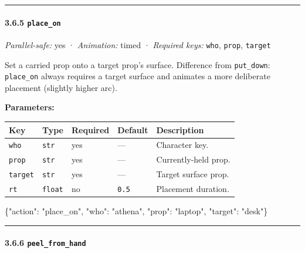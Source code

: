 \documentclass[
  12pt,
  letterpaper,
]{book}
\newenvironment{Shaded}{}{}
\newcommand{\DataTypeTok}[1]{\textcolor[rgb]{0.56,0.13,0.00}{#1}}
\newcommand{\FunctionTok}[1]{\textcolor[rgb]{0.02,0.16,0.49}{#1}}
\newcommand{\StringTok}[1]{\textcolor[rgb]{0.25,0.44,0.63}{#1}}
\begin{document}
\begin{center}\rule{0.5\linewidth}{0.5pt}\end{center}

\paragraph{\texorpdfstring{3.6.5
\texttt{place\_on}}{3.6.5 place\_on}}\label{place_on}

\emph{Parallel-safe:} yes · \emph{Animation:} timed · \emph{Required
keys:} \texttt{who}, \texttt{prop}, \texttt{target}

Set a carried prop onto a target prop's surface. Difference from
\texttt{put\_down}: \texttt{place\_on} always requires a target surface
and animates a more deliberate placement (slightly higher arc).

\textbf{Parameters:}

\begin{longtable}[]{@{}lllll@{}}
\toprule\noalign{}
Key & Type & Required & Default & Description \\
\midrule\noalign{}
\endhead
\bottomrule\noalign{}
\endlastfoot
\texttt{who} & \texttt{str} & yes & --- & Character key. \\
\texttt{prop} & \texttt{str} & yes & --- & Currently-held prop. \\
\texttt{target} & \texttt{str} & yes & --- & Target surface prop. \\
\texttt{rt} & \texttt{float} & no & \texttt{0.5} & Placement
duration. \\
\end{longtable}

\begin{Shaded}
\begin{Highlighting}[]
\FunctionTok{\{}\DataTypeTok{"action"}\FunctionTok{:} \StringTok{"place\_on"}\FunctionTok{,} \DataTypeTok{"who"}\FunctionTok{:} \StringTok{"athena"}\FunctionTok{,} \DataTypeTok{"prop"}\FunctionTok{:} \StringTok{"laptop"}\FunctionTok{,} \DataTypeTok{"target"}\FunctionTok{:} \StringTok{"desk"}\FunctionTok{\}}
\end{Highlighting}
\end{Shaded}

\begin{center}\rule{0.5\linewidth}{0.5pt}\end{center}

\paragraph{\texorpdfstring{3.6.6
\texttt{peel\_from\_hand}}{3.6.6 peel\_from\_hand}}\label{peel_from_hand}
\end{document}
